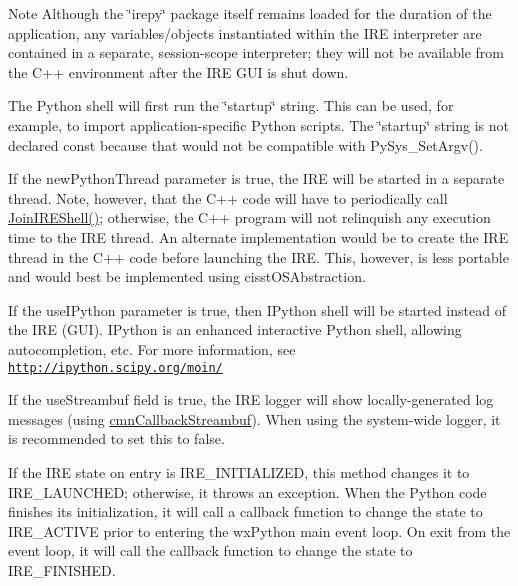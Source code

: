 \begin{DoxyNote}{Note}
Although the \char`\"{}irepy\char`\"{} package itself remains loaded for the duration of the application, any variables/objects instantiated within the I\+R\+E interpreter are contained in a separate, session-\/scope interpreter; they will not be available from the C++ environment after the I\+R\+E G\+U\+I is shut down.
\end{DoxyNote}
The Python shell will first run the \char`\"{}startup\char`\"{} string. This can be used, for example, to import application-\/specific Python scripts. The \char`\"{}startup\char`\"{} string is not declared const because that would not be compatible with Py\+Sys\+\_\+\+Set\+Argv().

If the new\+Python\+Thread parameter is true, the I\+R\+E will be started in a separate thread. Note, however, that the C++ code will have to periodically call \hyperlink{classire_framework_a272dfb38dadc652b543493a608061399}{Join\+I\+R\+E\+Shell()}; otherwise, the C++ program will not relinquish any execution time to the I\+R\+E thread. An alternate implementation would be to create the I\+R\+E thread in the C++ code before launching the I\+R\+E. This, however, is less portable and would best be implemented using cisst\+O\+S\+Abstraction.

If the use\+I\+Python parameter is true, then I\+Python shell will be started instead of the I\+R\+E (G\+U\+I). I\+Python is an enhanced interactive Python shell, allowing autocompletion, etc. For more information, see \href{http://ipython.scipy.org/moin/}{\tt http\+://ipython.\+scipy.\+org/moin/}

If the use\+Streambuf field is true, the I\+R\+E logger will show locally-\/generated log messages (using \hyperlink{classcmn_callback_streambuf}{cmn\+Callback\+Streambuf}). When using the system-\/wide logger, it is recommended to set this to false.

If the I\+R\+E state on entry is I\+R\+E\+\_\+\+I\+N\+I\+T\+I\+A\+L\+I\+Z\+E\+D, this method changes it to I\+R\+E\+\_\+\+L\+A\+U\+N\+C\+H\+E\+D; otherwise, it throws an exception. When the Python code finishes its initialization, it will call a callback function to change the state to I\+R\+E\+\_\+\+A\+C\+T\+I\+V\+E prior to entering the wx\+Python main event loop. On exit from the event loop, it will call the callback function to change the state to I\+R\+E\+\_\+\+F\+I\+N\+I\+S\+H\+E\+D. \hypertarget{classire_framework_a003bbae61193a9a61849b861039d0e89}{}
